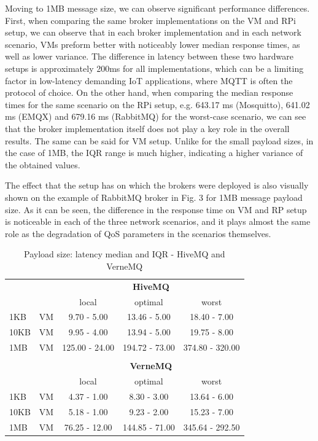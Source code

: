 \documentclass[conference]{IEEEtran}
\begin{document}
Moving to 1MB message size, we can observe significant performance differences. First, when
comparing the same broker implementations on the VM and RPi setup, we can observe that in each
broker implementation and in each network scenario, VMs preform better with noticeably lower
median response times, as well as lower variance. The difference in latency between these two
hardware setups is approximately 200ms for all implementations, which can be a limiting factor in
low-latency demanding IoT applications, where MQTT is often the protocol of choice. 
On the other
hand, when comparing the median response times for the same scenario on the RPi setup, e.g. 643.17
ms (Mosquitto), 641.02 ms (EMQX) and 679.16 ms (RabbitMQ) for the worst-case scenario, we can see
that the broker implementation itself does not play a key role in the overall results. The same can
be said for VM setup. Unlike for the small payload sizes, in the case of 1MB, the IQR range is
much higher, indicating a higher variance of the obtained values. 

The effect that the setup has on which the brokers were deployed is also visually shown on the example of RabbitMQ broker in  
Fig. 3 for  1MB message payload size. As it can be seen, the difference in the response time on VM and RP setup is noticeable in each of the three network scenarios, and it plays almost the same role as the degradation of QoS parameters in the scenarios themselves.   

\begin{table}[htbp]
    \centering
    \caption{Payload size: latency median and IQR - HiveMQ and VerneMQ}
    \label{table:vm_payload}
    \begin{tabular}{llccc}
        \toprule 
     &   & \multicolumn{3}{c}{\textbf{HiveMQ}} \\[0.5ex] 
     &   & local  & optimal  & worst  \\ 
     \midrule
    \multirow{1}{*}{1KB}    & VM & 9.70 - 5.00 & 13.46 - 5.00 &  18.40 - 7.00 \\[0.5ex]  \hline     
    \multirow{1}{*}{10KB} & VM  & 9.95 - 4.00   & 13.94 - 5.00 &  19.75 - 8.00  \\ [0.5ex]  \hline 
    \multirow{1}{*}{1MB}   & VM & 125.00 - 24.00 & 194.72 - 73.00 & 374.80 - 320.00  \\ 
     \bottomrule
     \\[0.5ex] 
     & & \multicolumn{3}{c}{\textbf{VerneMQ}} \\[0.5ex] 
     & & local   & optimal & worst  \\ 
     \midrule
     \multirow{1}{*}{1KB}    & VM & 4.37 - 1.00  & 8.30 - 3.00  & 13.64 - 6.00  \\ [0.5ex]  \hline                          
     \multirow{1}{*}{10KB} & VM   & 5.18 - 1.00  & 9.23 - 2.00 & 15.23 - 7.00 \\ [0.5ex] \hline
     \multirow{1}{*}{1MB}   & VM  & 76.25 - 12.00 & 144.85 - 71.00  & 345.64 - 292.50  \\
      \bottomrule
    \end{tabular}

    \end{table}
\end{document}
